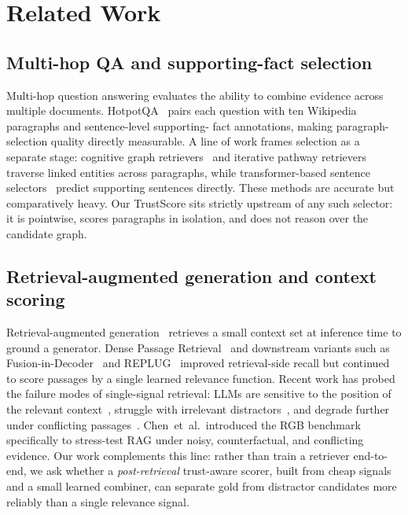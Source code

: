 \section{Related Work}
\label{sec:related-work}

\subsection{Multi-hop QA and supporting-fact selection}

Multi-hop question answering evaluates the ability to combine evidence
across multiple documents. HotpotQA~\cite{yang2018hotpotqa} pairs each
question with ten Wikipedia paragraphs and sentence-level supporting-
fact annotations, making paragraph-selection quality directly
measurable. A line of work frames selection as a separate stage:
cognitive graph retrievers~\cite{ding2019cognitivegraph} and iterative
pathway retrievers~\cite{asai2020learning} traverse linked entities
across paragraphs, while transformer-based sentence
selectors~\cite{nie2019revealing} predict supporting sentences
directly. These methods are accurate but comparatively heavy. Our
TrustScore sits strictly upstream of any such selector: it is
pointwise, scores paragraphs in isolation, and does not reason over
the candidate graph.

\subsection{Retrieval-augmented generation and context scoring}

Retrieval-augmented generation~\cite{lewis2020rag,guu2020realm}
retrieves a small context set at inference time to ground a generator.
Dense Passage Retrieval~\cite{karpukhin2020dense} and downstream
variants such as Fusion-in-Decoder~\cite{izacard2021fid} and
REPLUG~\cite{shi2023replug} improved retrieval-side recall but
continued to score passages by a single learned relevance function.
Recent work has probed the failure modes of single-signal retrieval:
LLMs are sensitive to the position of the relevant
context~\cite{liu2024lostinthemiddle}, struggle with irrelevant
distractors~\cite{yoran2024makingrag}, and degrade further under
conflicting passages~\cite{xie2024adaptive}. Chen~et~al.\ introduced
the RGB benchmark~\cite{chen2024rgb} specifically to stress-test RAG
under noisy, counterfactual, and conflicting evidence. Our work
complements this line: rather than train a retriever end-to-end, we
ask whether a \emph{post-retrieval} trust-aware scorer, built from
cheap signals and a small learned combiner, can separate gold from
distractor candidates more reliably than a single relevance signal.

